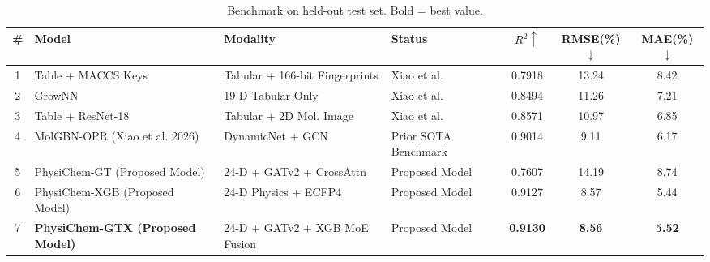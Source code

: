 \begin{table}[htbp]
\centering
\caption{Benchmark on held-out test set. Bold = best value.}
\label{tab:benchmark}
\begin{tabular}{clllccc}
\toprule
\# & Model & Modality & Status & $R^2\uparrow$ & RMSE(\%)$\downarrow$ & MAE(\%)$\downarrow$ \\
\midrule
1 & Table + MACCS Keys & Tabular + 166-bit Fingerprints & Xiao et al. & 0.7918 & 13.24 & 8.42 \\
2 & GrowNN & 19-D Tabular Only & Xiao et al. & 0.8494 & 11.26 & 7.21 \\
3 & Table + ResNet-18 & Tabular + 2D Mol. Image & Xiao et al. & 0.8571 & 10.97 & 6.85 \\
4 & MolGBN-OPR (Xiao et al. 2026) & DynamicNet + GCN & Prior SOTA Benchmark & 0.9014 & 9.11 & 6.17 \\
5 & PhysiChem-GT (Proposed Model) & 24-D + GATv2 + CrossAttn & Proposed Model & 0.7607 & 14.19 & 8.74 \\
6 & PhysiChem-XGB (Proposed Model) & 24-D Physics + ECFP4 & Proposed Model & 0.9127 & 8.57 & 5.44 \\
7 & \textbf{PhysiChem-GTX (Proposed Model)} & 24-D + GATv2 + XGB MoE Fusion & Proposed Model & \textbf{0.9130} & \textbf{8.56} & \textbf{5.52} \\
\bottomrule
\end{tabular}
\end{table}
